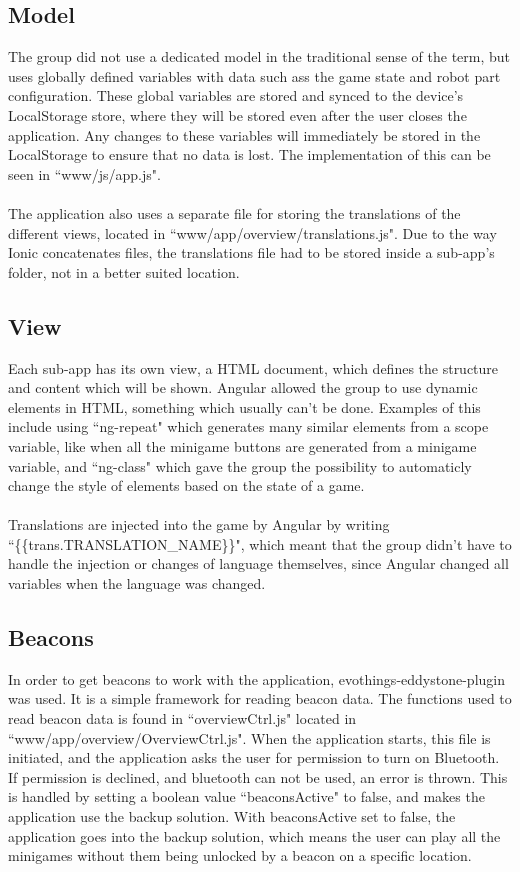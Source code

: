 \subsection{Model}
The group did not use a dedicated model in the traditional sense of the term, but uses globally defined variables with data such ass the game state and robot part configuration. These global variables are stored and synced to the device's LocalStorage store, where they will be stored even after the user closes the application. Any changes to these variables will immediately be stored in the LocalStorage to ensure that no data is lost. The implementation of this can be seen in ``www/js/app.js".\\\\
The application also uses a separate file for storing the translations of the different views, located in ``www/app/overview/translations.js". Due to the way Ionic concatenates files, the translations file had to be stored inside a sub-app's folder, not in a better suited location.

\subsection{View}
Each sub-app has its own view, a HTML document, which defines the structure and content which will be shown. Angular allowed the group to use dynamic elements in HTML, something which usually can't be done. Examples of this include using ``ng-repeat" which generates many similar elements from a scope variable, like when all the minigame buttons are generated from a minigame variable, and ``ng-class" which gave the group the possibility to automaticly change the style of elements based on the state of a game.\\\\
Translations are injected into the game by Angular by writing ``\{\{trans.TRANSLATION\_NAME\}\}", which meant that the group didn't have to handle the injection or changes of language themselves, since Angular changed all variables when the language was changed.

\subsection{Beacons}
In order to get beacons to work with the application, evothings-eddystone-plugin \cite{ibeacon_plugin} was used. It is a simple framework for reading beacon data. The functions used to read beacon data is found in  ``overviewCtrl.js" located in ``www/app/overview/OverviewCtrl.js". When the application starts, this file is initiated, and the application asks the user for permission to turn on Bluetooth. If permission is declined, and bluetooth can not be used, an error is thrown. This is handled by setting a boolean value ``beaconsActive" to false, and makes the application use the backup solution. With beaconsActive set to false, the application goes into the backup solution, which means the user can play all the minigames without them being unlocked by a beacon on a specific location.

